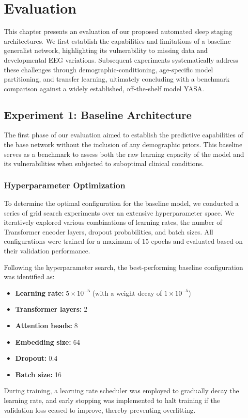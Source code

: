 \chapter{Evaluation}

This chapter presents an evaluation of our proposed automated sleep staging architectures.
We first establish the capabilities and limitations of a baseline generalist network,
highlighting its vulnerability to missing data and developmental EEG variations.
Subsequent experiments systematically address these challenges through demographic-conditioning,
age-specific model partitioning, and transfer learning, ultimately concluding with a benchmark comparison
against a widely established, off-the-shelf model YASA.

\section{Experiment 1: Baseline Architecture}
The first phase of our evaluation aimed to establish the predictive capabilities of the base network without the inclusion of any demographic priors. This baseline serves as a benchmark to assess both the raw learning capacity of the model and its vulnerabilities when subjected to suboptimal clinical conditions.

\subsection{Hyperparameter Optimization}
To determine the optimal configuration for the baseline model, we conducted a series of grid search experiments over an extensive hyperparameter space. We iteratively explored various combinations of learning rates, the number of Transformer encoder layers, dropout probabilities, and batch sizes. All configurations were trained for a maximum of 15 epochs and evaluated based on their validation performance.

Following the hyperparameter search, the best-performing baseline configuration was identified as:
\begin{itemize}
    \item \textbf{Learning rate:} $5 \times 10^{-5}$ (with a weight decay of $1 \times 10^{-5}$)
    \item \textbf{Transformer layers:} 2
    \item \textbf{Attention heads:} 8
    \item \textbf{Embedding size:} 64
    \item \textbf{Dropout:} 0.4
    \item \textbf{Batch size:} 16
\end{itemize}
During training, a learning rate scheduler was employed to gradually decay the learning rate, and early stopping was implemented to halt training if the validation loss ceased to improve, thereby preventing overfitting.

